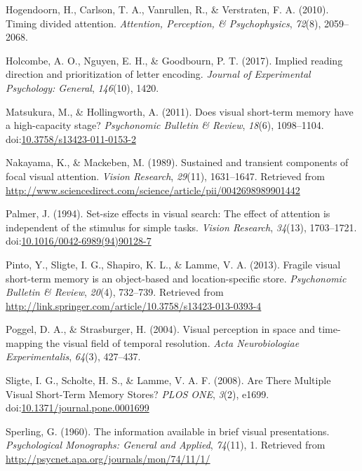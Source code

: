 \documentclass[,man]{apa6}
\theoremstyle{definition}
\theoremstyle{definition}
\theoremstyle{definition}
\theoremstyle{remark}
\begin{document}
\hypertarget{ref-hogendoorn_timing_2010}{}
Hogendoorn, H., Carlson, T. A., Vanrullen, R., \& Verstraten, F. A.
(2010). Timing divided attention. \emph{Attention, Perception, \&
Psychophysics}, \emph{72}(8), 2059--2068.

\hypertarget{ref-holcombe_implied_2017}{}
Holcombe, A. O., Nguyen, E. H., \& Goodbourn, P. T. (2017). Implied
reading direction and prioritization of letter encoding. \emph{Journal
of Experimental Psychology: General}, \emph{146}(10), 1420.

\hypertarget{ref-matsukura_does_2011}{}
Matsukura, M., \& Hollingworth, A. (2011). Does visual short-term memory
have a high-capacity stage? \emph{Psychonomic Bulletin \& Review},
\emph{18}(6), 1098--1104.
doi:\href{https://doi.org/10.3758/s13423-011-0153-2}{10.3758/s13423-011-0153-2}

\hypertarget{ref-nakayama_sustained_1989}{}
Nakayama, K., \& Mackeben, M. (1989). Sustained and transient components
of focal visual attention. \emph{Vision Research}, \emph{29}(11),
1631--1647. Retrieved from
\url{http://www.sciencedirect.com/science/article/pii/0042698989901442}

\hypertarget{ref-palmer_set-size_1994}{}
Palmer, J. (1994). Set-size effects in visual search: The effect of
attention is independent of the stimulus for simple tasks. \emph{Vision
Research}, \emph{34}(13), 1703--1721.
doi:\href{https://doi.org/10.1016/0042-6989(94)90128-7}{10.1016/0042-6989(94)90128-7}

\hypertarget{ref-pinto_fragile_2013}{}
Pinto, Y., Sligte, I. G., Shapiro, K. L., \& Lamme, V. A. (2013).
Fragile visual short-term memory is an object-based and
location-specific store. \emph{Psychonomic Bulletin \& Review},
\emph{20}(4), 732--739. Retrieved from
\url{http://link.springer.com/article/10.3758/s13423-013-0393-4}

\hypertarget{ref-poggel_visual_2004}{}
Poggel, D. A., \& Strasburger, H. (2004). Visual perception in space and
time-mapping the visual field of temporal resolution. \emph{Acta
Neurobiologiae Experimentalis}, \emph{64}(3), 427--437.

\hypertarget{ref-sligte_are_2008}{}
Sligte, I. G., Scholte, H. S., \& Lamme, V. A. F. (2008). Are There
Multiple Visual Short-Term Memory Stores? \emph{PLOS ONE}, \emph{3}(2),
e1699.
doi:\href{https://doi.org/10.1371/journal.pone.0001699}{10.1371/journal.pone.0001699}

\hypertarget{ref-sperling_information_1960}{}
Sperling, G. (1960). The information available in brief visual
presentations. \emph{Psychological Monographs: General and Applied},
\emph{74}(11), 1. Retrieved from
\url{http://psycnet.apa.org/journals/mon/74/11/1/}
\end{document}
